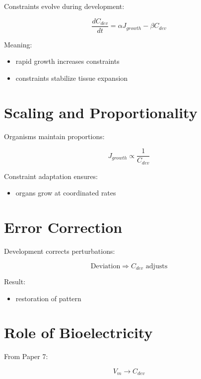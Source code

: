 \documentclass[11pt]{article}
\begin{document}
Constraints evolve during development:

\begin{equation}
\frac{dC_{dev}}{dt} = \alpha J_{growth} - \beta C_{dev}
\end{equation}

Meaning:

\begin{itemize}
    \item rapid growth increases constraints
    \item constraints stabilize tissue expansion
\end{itemize}

\section{Scaling and Proportionality}

Organisms maintain proportions:

\begin{equation}
J_{growth} \propto \frac{1}{C_{dev}}
\end{equation}

Constraint adaptation ensures:

\begin{itemize}
    \item organs grow at coordinated rates
\end{itemize}

\section{Error Correction}

Development corrects perturbations:

\begin{equation}
\text{Deviation} \Rightarrow C_{dev} \text{ adjusts}
\end{equation}

Result:

\begin{itemize}
    \item restoration of pattern
\end{itemize}

\section{Role of Bioelectricity}

From Paper 7:

\begin{equation}
V_m \rightarrow C_{dev}
\end{equation}
\end{document}
